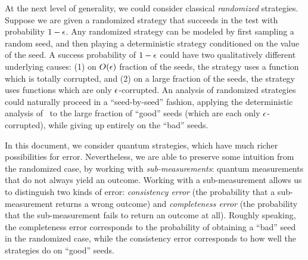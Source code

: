 At the next level of generality, we could consider classical
\emph{randomized} strategies. Suppose we are given a randomized
strategy that succeeds in the test with probability $1 - \epsilon$. Any
randomized strategy can be modeled by first sampling a random seed,
and then playing a deterministic strategy conditioned on the value of
the seed. A success probability of $1 - \epsilon$ could have two
qualitatively different underlying causes: (1) on $O(\epsilon)$ fraction
of the seeds, the strategy uses a function which is totally corrupted,
and (2) on a large fraction of the seeds, the strategy uses functions
which are only $\epsilon$-corrupted. An analysis of randomized
strategies could naturally proceed in a ``seed-by-seed'' fashion, applying the
deterministic analysis of~\cite{BFL91} to the large fraction of ``good'' seeds (which
are each only $\epsilon$-corrupted), while giving up entirely on the
``bad'' seeds. 

In this document, we consider quantum strategies, which
have much richer possibilities for error. Nevertheless, we are able to
preserve some intuition from the randomized case, by working with
\emph{sub-measurements}: quantum measurements that do not always yield
an outcome. Working with a sub-measurement allows us to distinguish two
kinds of error: \emph{consistency error} (the probability that a
sub-measurement returns a wrong outcome) and \emph{completeness error}
(the probability that the sub-measurement fails to return an outcome at
all). Roughly speaking, the completeness error corresponds to the
probability of obtaining a ``bad'' seed in the randomized case, while
the consistency error corresponds to how well the strategies do on
``good'' seeds. 

